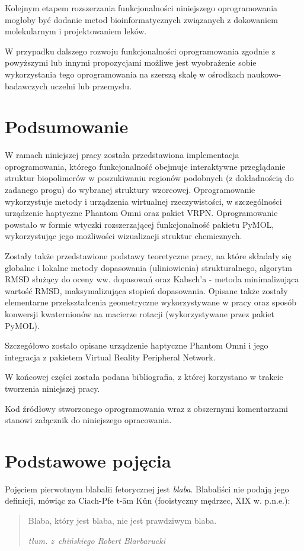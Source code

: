 \documentclass[licencjacka]{pracamgr}
\begin{document}
Kolejnym etapem rozszerzania funkcjonalności niniejszego oprogramowania mogłoby być dodanie metod bioinformatycznych związanych z dokowaniem molekularnym i projektowaniem leków.

W przypadku dalszego rozwoju funkcjonalności oprogramowania zgodnie z powyższymi lub innymi propozycjami możliwe jest wyobrażenie sobie wykorzystania tego oprogramowania na szerszą skalę w ośrodkach naukowo-badawczych uczelni lub przemysłu.

\chapter{Podsumowanie}

W ramach niniejszej pracy została przedstawiona implementacja oprogramowania, którego funkcjonalność obejmuje interaktywne przeglądanie struktur biopolimerów w poszukiwaniu regionów podobnych (z dokładnością do zadanego progu) do wybranej struktury wzorcowej. Oprogramowanie wykorzystuje metody i urządzenia wirtualnej rzeczywistości, w szczególności urządzenie haptyczne Phantom Omni oraz pakiet VRPN. Oprogramowanie powstało w formie wtyczki rozszerzającej funkcjonalność pakietu PyMOL, wykorzystując jego możliwości wizualizacji struktur chemicznych.

Zostały także przedstawione podstawy teoretyczne pracy, na które składały się globalne i lokalne metody dopasowania (uliniowienia) strukturalnego, algorytm RMSD służący do oceny ww. dopasowań oraz Kabsch'a - metoda minimalizująca wartość RMSD, maksymalizująca stopień dopasowania. Opisane także zostały elementarne przekształcenia geometryczne wykorzystywane w pracy oraz sposób konwersji kwaternionów na macierze rotacji (wykorzystywane przez pakiet PyMOL).

Szczegółowo zostało opisane urządzenie haptyczne Phantom Omni i jego integracja z pakietem Virtual Reality Peripheral Network.

W końcowej części została podana bibliografia, z której korzystano w trakcie tworzenia niniejszej pracy. 

Kod źródłowy stworzonego oprogramowania wraz z obszernymi komentarzami stanowi załącznik do niniejszego opracowania.

\iffalse
\chapter{Podstawowe pojęcia}\label{r:pojecia}

Pojęciem pierwotnym blabalii fetorycznej jest \emph{blaba}.
Blabaliści nie podają jego definicji, mówiąc za Ciach-Pfe t-\=am
K\^un (fooistyczny mędrzec, XIX w. p.n.e.):
\begin{quote}
  Blaba, który jest blaba, nie jest prawdziwym blaba.

\raggedleft\slshape tłum. z~chińskiego Robert Blarbarucki
\end{quote}
\end{document}
